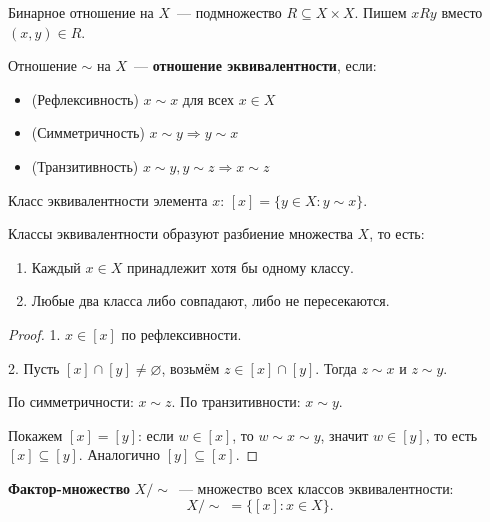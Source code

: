 \documentclass[12pt]{article}
\begin{document}
	\begin{definition}
		Бинарное отношение на $X$~--- подмножество $R \subseteq X \times X$. Пишем $xRy$ вместо $(x, y) \in R$.
	\end{definition}
	
	\begin{definition}
		Отношение $\sim$ на $X$~--- \textbf{отношение эквивалентности}, если:
		\begin{itemize}
			\item (Рефлексивность) $x \sim x$ для всех $x \in X$
			\item (Симметричность) $x \sim y \Rightarrow y \sim x$
			\item (Транзитивность) $x \sim y, y \sim z \Rightarrow x \sim z$
		\end{itemize}
	\end{definition}
	
	\begin{definition}
		Класс эквивалентности элемента $x$: $[x] = \{y \in X : y \sim x\}$.
	\end{definition}
	
	\begin{theorem}
		Классы эквивалентности образуют разбиение множества $X$, то есть:
		\begin{enumerate}
			\item Каждый $x \in X$ принадлежит хотя бы одному классу.
			\item Любые два класса либо совпадают, либо не пересекаются.
		\end{enumerate}
	\end{theorem}
	
	\begin{proof}
		1. $x \in [x]$ по рефлексивности.
		
		2. Пусть $[x] \cap [y] \neq \varnothing$, возьмём $z \in [x] \cap [y]$. Тогда $z \sim x$ и $z \sim y$.
		
		По симметричности: $x \sim z$. По транзитивности: $x \sim y$.
		
		Покажем $[x] = [y]$: если $w \in [x]$, то $w \sim x \sim y$, значит $w \in [y]$, то есть $[x] \subseteq [y]$. Аналогично $[y] \subseteq [x]$.
	\end{proof}
	
	\begin{definition}
		\textbf{Фактор-множество} $X / {\sim}$~--- множество всех классов эквивалентности:
		\[X / {\sim} \; = \{[x] : x \in X\}.\]
	\end{definition}
	
\end{document}
